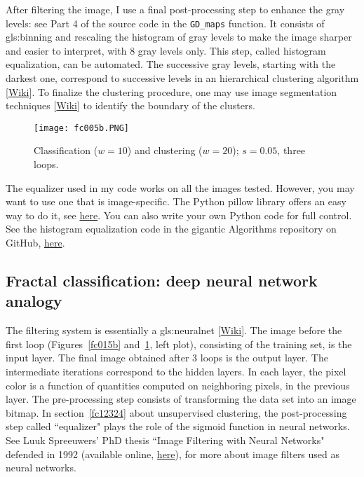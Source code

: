 \documentclass[oneside,10pt]{book}
\begin{document}
After filtering the image, I use a final post-processing step to enhance the gray levels: see Part 4 of the source code in the \texttt{GD\_maps} function. It  consists of \gls{gls:binning} and rescaling the histogram of gray levels to make the image sharper and easier to interpret, with 8 gray levels only. This step, called 
\textcolor{index}{histogram equalization},  can be automated. The successive gray levels, starting with the darkest one, correspond to successive levels in an 
\textcolor{index}{hierarchical clustering} algorithm [\href{https://en.wikipedia.org/wiki/Hierarchical_clustering}{Wiki}]. To finalize the clustering procedure, one may use \textcolor{index}{image segmentation} techniques [\href{https://en.wikipedia.org/wiki/Image_segmentation}{Wiki}] to identify the boundary of the clusters.

\begin{figure}[H]
\centering
\texttt{[image: fc005b.PNG]}
\caption{Classification ($w=10$) and clustering ($w=20$); $s=0.05$, three loops.}
\label{fc005b}
\end{figure}

The equalizer used in my code works on all the images tested. However, you may want to use one that is image-specific. The Python pillow library offers an easy way to do it, see
\href{https://www.geeksforgeeks.org/python-pil-imageops-equalize-method/}{here}. You can also write your own Python code for full control. See the histogram equalization
 code in the gigantic Algorithms repository on GitHub, \href{https://github.com/TheAlgorithms/Python/blob/master/digital_image_processing/histogram_equalization/histogram_stretch.py}{here}. 


\subsection{Fractal classification: deep neural network analogy}\label{fcfract}



The filtering system is essentially a \gls{gls:neuralnet} [\href{https://en.wikipedia.org/wiki/Neural_network}{Wiki}]. The image before the first loop (Figures~\ref{fc015b} and~\ref{fc005b}, left plot), consisting of the training set,  is the input layer. The final image obtained after 3 loops
is the output layer. The intermediate iterations correspond to the \textcolor{index}{hidden layers}. In each layer, the pixel color is a function of quantities computed on neighboring pixels, in the previous layer.
The pre-processing step consists of transforming the data set into an image bitmap. In section~\ref{fc12324} about unsupervised clustering, the post-processing step called ``equalizer" plays the role of the sigmoid function in neural networks.
 See Luuk Spreeuwers' PhD thesis ``Image Filtering with Neural Networks" defended in 1992 \cite{luuk} (available online, \href{https://ris.utwente.nl/ws/portalfiles/portal/255169420/Thesis_L_Spreeuwers.pdf}{here}), for more about image filters used as neural networks. 
\end{document}

